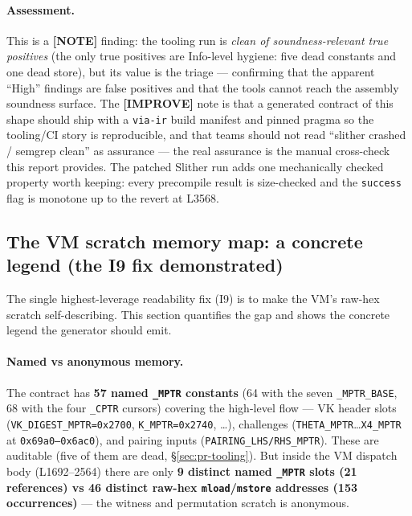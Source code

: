 \paragraph{Assessment.} This is a
\textcolor{mathpurple}{\textbf{[NOTE]}} finding: the tooling run
is \emph{clean of soundness-relevant true positives} (the only true
positives are Info-level hygiene: five dead constants and one dead
store), but its value is the
triage --- confirming that the apparent ``High'' findings are
false positives and that the tools cannot reach the assembly
soundness surface. The \textcolor{codegenblue}{\textbf{[IMPROVE]}}
note is that a generated contract of this shape should ship with a
\texttt{via-ir} build manifest and pinned pragma so the
tooling/CI story is reproducible, and that teams should not read
``slither crashed / semgrep clean'' as assurance --- the real
assurance is the manual cross-check this report provides. The
patched Slither run adds one mechanically checked property worth
keeping: every precompile result is size-checked and the
\texttt{success} flag is monotone up to the revert at L3568.

\subsection{The VM scratch memory map: a concrete legend (the I9 fix demonstrated)}
\label{sec:pr-legend}

The single highest-leverage readability fix (I9) is to make the
VM's raw-hex scratch self-describing. This section quantifies the
gap and shows the concrete legend the generator should emit.

\paragraph{Named vs anonymous memory.}
The contract has \textbf{57 named \texttt{\_MPTR}
constants} (64 with the seven \texttt{\_MPTR\_BASE}, 68 with the
four \texttt{\_CPTR} cursors) covering the high-level flow --- VK header slots
(\texttt{VK\_\allowbreak{}DIGEST\_\allowbreak{}MPTR=0x2700}, \texttt{K\_MPTR=0x2740},
\ldots), challenges (\texttt{THETA\_MPTR}\ldots\texttt{X4\_MPTR} at
\texttt{0x69a0--0x6ac0}), and pairing inputs
(\texttt{PAIRING\_\allowbreak{}LHS/\allowbreak{}RHS\_\allowbreak{}MPTR}). These are auditable (five of
them are dead, \S\ref{sec:pr-tooling}). But
inside the VM dispatch body (L1692--2564) there are only
\textbf{9 distinct named \texttt{\_MPTR} slots (21 references) vs
46 distinct raw-hex \texttt{mload}/\texttt{mstore} addresses (153
occurrences)} --- the witness and
permutation scratch is anonymous.


